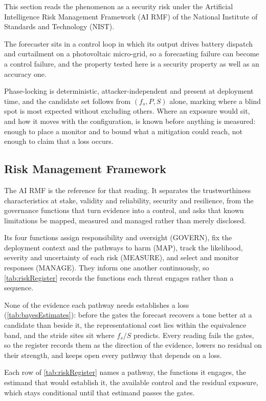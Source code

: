 This section reads the phenomenon as a security risk under the Artificial Intelligence Risk Management Framework (AI RMF) of the National Institute of Standards and Technology (NIST).

The forecaster sits in a control loop in which its output drives battery dispatch and curtailment on a photovoltaic micro-grid, so a forecasting failure can become a control failure, and the property tested here is a security property as well as an accuracy one.

Phase-locking is deterministic, attacker-independent and present at deployment time, and the candidate set follows from $(f_s,P,S)$ alone, marking where a blind spot is most expected without excluding others. Where an exposure would sit, and how it moves with the configuration, is known before anything is measured: enough to place a monitor and to bound what a mitigation could reach, not enough to claim that a loss occurs.

\subsection{Risk Management Framework}
The AI RMF\autocite{tabassiArtificialIntelligenceRisk2023} is the reference for that reading. It separates the trustworthiness characteristics at stake, validity and reliability, security and resilience, from the governance functions that turn evidence into a control, and asks that known limitations be mapped, measured and managed rather than merely disclosed.

Its four functions assign responsibility and oversight (GOVERN), fix the deployment context and the pathways to harm (MAP), track the likelihood, severity and uncertainty of each risk (MEASURE), and select and monitor responses (MANAGE). They inform one another continuously, so \autoref{tab:riskRegister} records the functions each threat engages rather than a sequence.

None of the evidence each pathway needs establishes a loss (\autoref{tab:bayesEstimates}): before the gates the forecast recovers a tone better at a candidate than beside it, the representational cost lies within the equivalence band, and the stride sites sit where $f_s/S$ predicts. Every reading fails the gates, so the register records them as the direction of the evidence, lowers no residual on their strength, and keeps open every pathway that depends on a loss.

Each row of \autoref{tab:riskRegister} names a pathway, the functions it engages, the estimand that would establish it, the available control and the residual exposure, which stays conditional until that estimand passes the gates.

